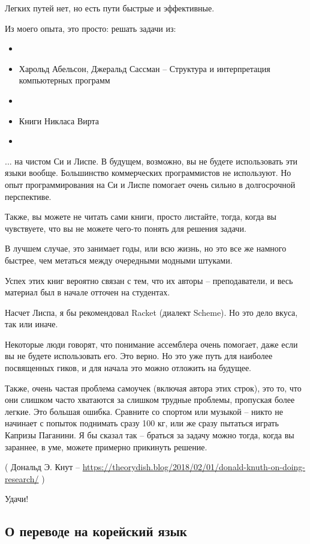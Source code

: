 Легких путей нет, но есть пути быстрые и эффективные.

Из моего опыта, это просто: решать задачи из:

\begin{itemize}
\item \KRBook
\item Харольд Абельсон, Джеральд Сассман -- Структура и интерпретация компьютерных программ
\item \TAOCP
\item Книги Никласа Вирта
\item \RobPikePractice
\end{itemize}

... на чистом Си и Лиспе.
В будущем, возможно, вы не будете использовать эти языки вообще.
Большинство коммерческих программистов не используют. Но опыт программирования на Си и Лиспе помогает очень сильно в 
долгосрочной перспективе.

Также, вы можете не читать сами книги, просто листайте, тогда, когда вы чувствуете, что вы не можете чего-то
понять для решения задачи.

В лучшем случае, это занимает годы, или всю жизнь, но это все же намного быстрее, чем метаться между очередными модными
штуками.

Успех этих книг вероятно связан с тем, что их авторы -- преподаватели, и весь материал был в начале отточен на студентах.

Насчет Лиспа, я бы рекомендовал Racket (диалект Scheme). Но это дело вкуса, так или иначе.

Некоторые люди говорят, что понимание ассемблера очень помогает, даже если вы не будете использовать его.
Это верно.
Но это уже путь для наиболее посвященных гиков, и для начала это можно отложить на будущее.

Также, очень частая проблема самоучек (включая автора этих строк), это то, что они слишком часто хватаются
за слишком трудные проблемы, пропуская более легкие.
Это большая ошибка.
Сравните со спортом или музыкой -- никто не начинает с попыток поднимать сразу 100 кг,
или же сразу пытаться играть Капризы Паганини.
Я бы сказал так -- браться за задачу можно тогда, когда вы зараннее, в уме, можете примерно прикинуть решение.


( Дональд Э. Кнут -- \url{https://theorydish.blog/2018/02/01/donald-knuth-on-doing-research/} )

Удачи!

\subsection*{О переводе на корейский язык}

